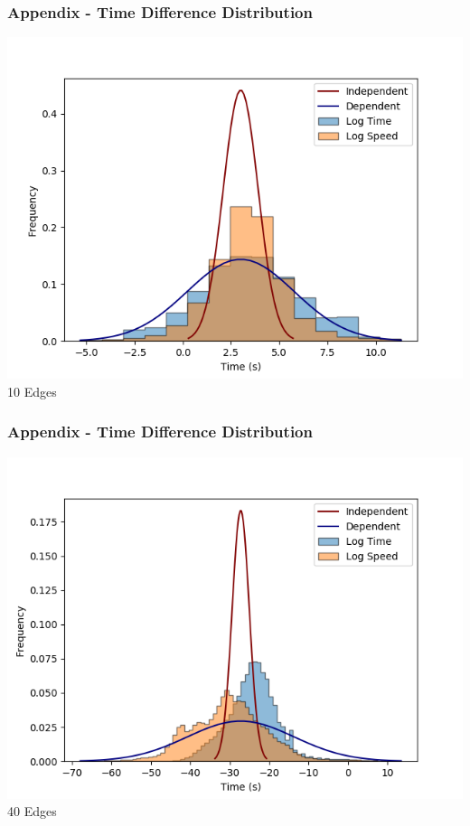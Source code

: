 \documentclass{beamer}
\begin{document}
	\begin{frame}
		\frametitle{Appendix -  Time Difference Distribution}
		\includegraphics[width=\textwidth,height=\textheight,keepaspectratio]{DiffDist-10-10.png}
		10 Edges
	\end{frame}
	\begin{frame}
		\frametitle{Appendix -  Time Difference Distribution}
		\includegraphics[width=\textwidth,height=\textheight,keepaspectratio]{DiffDist-8-40.png}
		40 Edges
	\end{frame}
\end{document}
